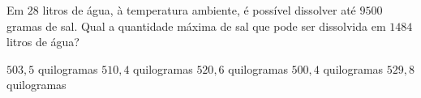 Em $28$ litros de água, à temperatura ambiente, é possível dissolver até $9500$ gramas de sal. Qual a quantidade máxima de sal que pode ser dissolvida em $1484$ litros de água?

$503{,}5$ quilogramas
$510{,}4$ quilogramas
$520{,}6$ quilogramas
$500{,}4$ quilogramas
$529{,}8$ quilogramas




